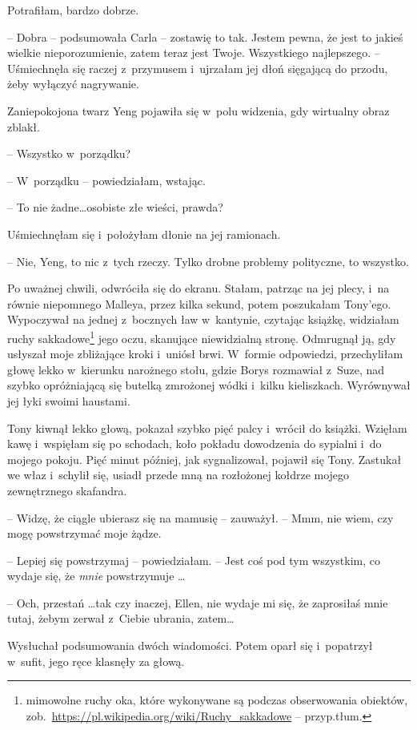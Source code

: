 \documentclass[oneside,polish,11pt,sfheadings]{mwbk}
\begin{document}
Potrafiłam, bardzo dobrze.

-- Dobra -- podsumowała Carla -- zostawię to tak. Jestem pewna, że jest to
jakieś wielkie nieporozumienie, zatem teraz jest Twoje. Wszystkiego
najlepszego. -- Uśmiechnęła się raczej z~przymusem i~ujrzałam jej dłoń
sięgającą do przodu, żeby wyłączyć nagrywanie.

Zaniepokojona twarz Yeng pojawiła się w~polu widzenia, gdy wirtualny
obraz zblakł. 

-- Wszystko w~porządku?

-- W~porządku -- powiedziałam, wstając.

-- To nie żadne\ldots  osobiste złe wieści, prawda?

Uśmiechnęłam się i~położyłam dłonie na jej ramionach. 

-- Nie, Yeng, to
nic z~tych rzeczy. Tylko drobne problemy polityczne, to wszystko.

Po uważnej chwili, odwróciła się do ekranu. Stałam, patrząc na jej
plecy, i~na równie niepomnego Malleya, przez kilka sekund, potem
poszukałam Tony'ego. Wypoczywał na jednej z~bocznych ław w~kantynie,
czytając książkę, widziałam ruchy sakkadowe\footnote{mimowolne ruchy oka,
które wykonywane są podczas obserwowania obiektów,
zob.~\url{https://pl.wikipedia.org/wiki/Ruchy\_sakkadowe} -- przyp.tłum.} jego oczu, skanujące niewidzialną stronę. Odmrugnął ją,
gdy usłyszał moje zbliżające kroki i~uniósł brwi. W~formie odpowiedzi,
przechyliłam głowę lekko w~kierunku narożnego stołu, gdzie Borys
rozmawiał z~Suze, nad szybko opróżniającą się butelką zmrożonej wódki i~kilku kieliszkach. Wyrównywał jej łyki swoimi haustami.

Tony kiwnął lekko głową, pokazał szybko pięć palcy i~wrócił do książki.
Wzięłam kawę i~wspięłam się po schodach, koło pokładu dowodzenia do
sypialni i~do mojego pokoju. Pięć minut później, jak sygnalizował,
pojawił się Tony. Zastukał we właz i~schylił się, usiadł przede mną na
rozłożonej kołdrze mojego zewnętrznego skafandra.

-- Widzę, że ciągle ubierasz się na mamusię -- zauważył. -- Mmm, nie wiem,
czy mogę powstrzymać moje żądze.

-- Lepiej się powstrzymaj -- powiedziałam. -- Jest coś pod tym wszystkim,
co wydaje się, że \textit{mnie} powstrzymuje \ldots 

-- Och, przestań \ldots  tak czy inaczej, Ellen, nie wydaje mi się, że
zaprosiłaś mnie tutaj, żebym zerwał z~Ciebie ubrania, zatem\ldots 

Wysłuchał podsumowania dwóch wiadomości. Potem oparł się i~popatrzył w~sufit, jego ręce klasnęły za głową.
\end{document}
